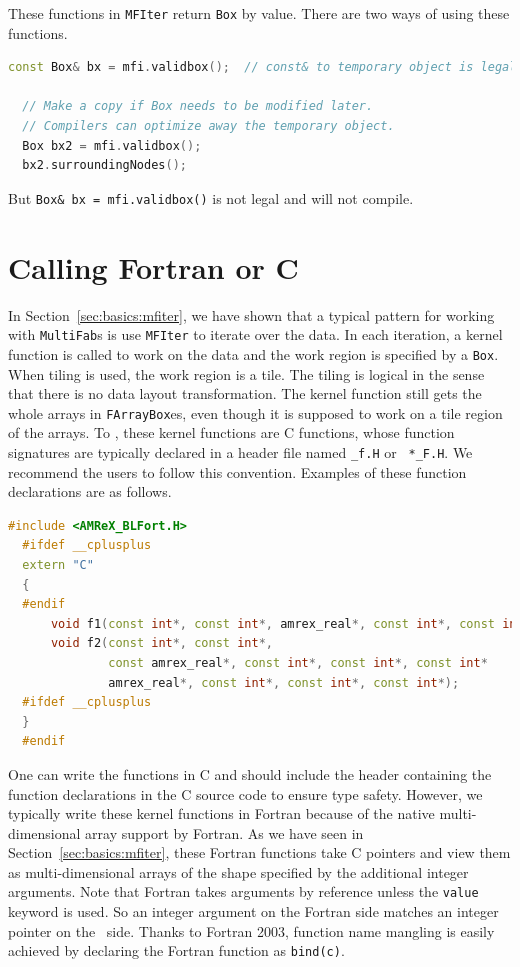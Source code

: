 {{These functions in {\tt MFIter} return {\tt Box} by value.  There are
two ways of using these functions.
\begin{lstlisting}[language=cpp]
  const Box& bx = mfi.validbox();  // const& to temporary object is legal

  // Make a copy if Box needs to be modified later.
  // Compilers can optimize away the temporary object.
  Box bx2 = mfi.validbox();
  bx2.surroundingNodes();
\end{lstlisting}
But {\tt Box\& bx = mfi.validbox()} is not legal and will not compile.  

\section{Calling Fortran or C}
\label{sec:basics:fortran}

In Section~\ref{sec:basics:mfiter}, we have shown that a typical
pattern for working with {\tt MultiFab}s is use {\tt MFIter} to
iterate over the data.  In each iteration, a kernel function is called
to work on the data and the work region is specified by a {\tt Box}.
When tiling is used, the work region is a tile.  The tiling is logical
in the sense that there is no data layout transformation.  The kernel
function still gets the whole arrays in {\tt FArrayBox}es, even though
it is supposed to work on a tile region of the arrays.  To \cpp, these
kernel functions are C functions, whose function signatures are
typically declared in a header file named {\tt *\_f.H} or {\tt
  *\_F.H}.  We recommend the users to follow this convention.
Examples of these function declarations are as follows.
\begin{lstlisting}[language=cpp]
  #include <AMReX_BLFort.H>
  #ifdef __cplusplus
  extern "C"
  {
  #endif
      void f1(const int*, const int*, amrex_real*, const int*, const int*);
      void f2(const int*, const int*,
              const amrex_real*, const int*, const int*, const int*
              amrex_real*, const int*, const int*, const int*);
  #ifdef __cplusplus
  }
  #endif
\end{lstlisting}
One can write the functions in C and should include the header
containing the function declarations in the C source code to ensure
type safety.  However, we typically write these kernel functions in
Fortran because of the native multi-dimensional array support by
Fortran.  As we have seen in Section~\ref{sec:basics:mfiter}, these
Fortran functions take C pointers and view them as multi-dimensional
arrays of the shape specified by the additional integer arguments.
Note that Fortran takes arguments by reference unless the {\tt value}
keyword is used.  So an integer argument on the Fortran side matches
an integer pointer on the \cpp\ side.  Thanks to Fortran 2003,
function name mangling is easily achieved by declaring the Fortran
function as {\tt bind(c)}.

}}
